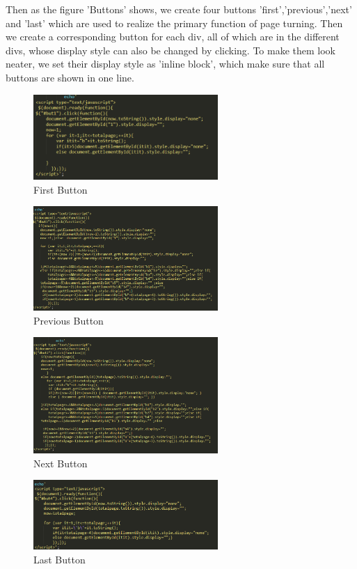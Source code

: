 \documentclass{book}
\begin{document}
Then as the figure 'Buttons' shows, we create four buttons 'first','previous','next' and 'last' which are used to realize the primary function of page turning. Then we create a corresponding button for each div, all of which are in the different divs, whose display style can also be changed by clicking. To make them look neater, we set their display style as 'inline block', which make sure that all buttons are shown in one line.

\begin{figure}[H]
\centering
\includegraphics[width=7.0cm]{img/dsw_first1.png}
\caption{First Button}
\end{figure}

\begin{figure}[H]
\centering
\includegraphics[width=7.0cm]{img/dsw_pr1.png}
\caption{Previous Button}
\end{figure}

\begin{figure}[H]
\centering
\includegraphics[width=7.0cm]{img/dsw_next1.png}
\caption{Next Button}
\end{figure}

\begin{figure}[H]
\centering
\includegraphics[width=7.0cm]{img/dsw_last1.png}
\caption{Last Button}
\end{figure}
\end{document}
